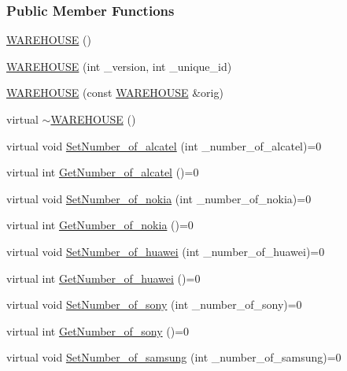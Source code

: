 \subsubsection*{Public Member Functions}
\begin{DoxyCompactItemize}
\item 
\hyperlink{class_w_a_r_e_h_o_u_s_e_a7a924d389af91f54ed0e1d1d8d56ec57}{W\+A\+R\+E\+H\+O\+U\+SE} ()
\item 
\hyperlink{class_w_a_r_e_h_o_u_s_e_a91a50ed8f6eeb344b1785f750532b18a}{W\+A\+R\+E\+H\+O\+U\+SE} (int \+\_\+version, int \+\_\+unique\+\_\+id)
\item 
\hyperlink{class_w_a_r_e_h_o_u_s_e_a4782d251d2203377f8e9f331ba3b0a7e}{W\+A\+R\+E\+H\+O\+U\+SE} (const \hyperlink{class_w_a_r_e_h_o_u_s_e}{W\+A\+R\+E\+H\+O\+U\+SE} \&orig)
\item 
virtual \hyperlink{class_w_a_r_e_h_o_u_s_e_ad5aa686839d7be9bfea33d469c58086b}{$\sim$\+W\+A\+R\+E\+H\+O\+U\+SE} ()
\item 
virtual void \hyperlink{class_w_a_r_e_h_o_u_s_e_aa1353184ecc71cce178d76b77f37158b}{Set\+Number\+\_\+of\+\_\+alcatel} (int \+\_\+number\+\_\+of\+\_\+alcatel)=0
\item 
virtual int \hyperlink{class_w_a_r_e_h_o_u_s_e_a2b19e422d84873daecf0e87bf8df900c}{Get\+Number\+\_\+of\+\_\+alcatel} ()=0
\item 
virtual void \hyperlink{class_w_a_r_e_h_o_u_s_e_a13ace834a25aab61c689a7cedad94343}{Set\+Number\+\_\+of\+\_\+nokia} (int \+\_\+number\+\_\+of\+\_\+nokia)=0
\item 
virtual int \hyperlink{class_w_a_r_e_h_o_u_s_e_a27681648a8edcaee6c968b7ffe97ef40}{Get\+Number\+\_\+of\+\_\+nokia} ()=0
\item 
virtual void \hyperlink{class_w_a_r_e_h_o_u_s_e_ac0bd1c55f03bd8685163c0413be30ed1}{Set\+Number\+\_\+of\+\_\+huawei} (int \+\_\+number\+\_\+of\+\_\+huawei)=0
\item 
virtual int \hyperlink{class_w_a_r_e_h_o_u_s_e_adc96b7eec7ce949b02d5413fa3815991}{Get\+Number\+\_\+of\+\_\+huawei} ()=0
\item 
virtual void \hyperlink{class_w_a_r_e_h_o_u_s_e_aaa0244f513caf1c886a4bd24af72d8aa}{Set\+Number\+\_\+of\+\_\+sony} (int \+\_\+number\+\_\+of\+\_\+sony)=0
\item 
virtual int \hyperlink{class_w_a_r_e_h_o_u_s_e_a7bac68719dc829c5002dfe4333300b76}{Get\+Number\+\_\+of\+\_\+sony} ()=0
\item 
virtual void \hyperlink{class_w_a_r_e_h_o_u_s_e_a251878c76f2143c0db5863548118555c}{Set\+Number\+\_\+of\+\_\+samsung} (int \+\_\+number\+\_\+of\+\_\+samsung)=0

\end{DoxyCompactItemize}
